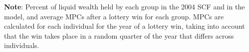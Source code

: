 \documentclass[\latexroot/\projectname]{subfiles}
\begin{document}
\begin{table}[tb] 
  \caption{\pregenmark Model fit with respect to nontargeted moments}
  \whenintegrated{\label{tab:nonTargetedMoments}} %
  \centering


  \vspace{0.5em}

  \noindent\parbox{\textwidth}{\footnotesize
    \textbf{Note}: Percent of liquid wealth held by each group in the 2004 SCF and in the model, and average MPCs after a lottery win for each group. MPCs are calculated for each individual for the year of a lottery win, taking into account that the win takes place in a random quarter of the year that differs across individuals.}

  \vspace{0.5em}

\end{table}
\end{document}
